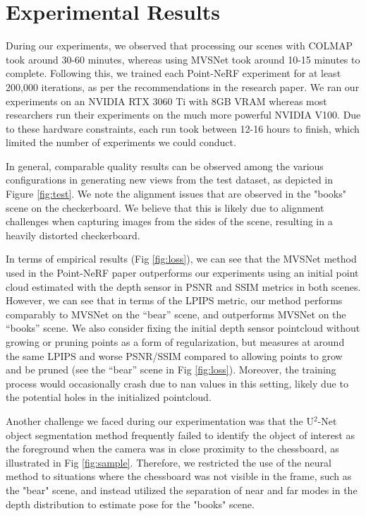 \documentclass[10pt,twocolumn,letterpaper]{article}
\begin{document}
\section{Experimental Results}
During our experiments, we observed that processing our scenes with COLMAP took around 30-60 minutes, whereas using MVSNet took around 10-15 minutes to complete. Following this, we trained each Point-NeRF experiment for at least 200,000 iterations, as per the recommendations in the research paper. We ran our experiments on an NVIDIA RTX 3060 Ti with 8GB VRAM whereas most researchers run their experiments on the much more powerful NVIDIA V100. Due to these hardware constraints, each run took between 12-16 hours to finish, which limited the number of experiments we could conduct. 

In general, comparable quality results can be observed among the various configurations in generating new views from the test dataset, as depicted in Figure \ref{fig:test}. We note the alignment issues that are observed in the "books" scene on the checkerboard. We believe that this is likely due to alignment challenges when capturing images from the sides of the scene, resulting in a heavily distorted checkerboard.

In terms of empirical results (Fig \ref{fig:loss}), we can see that the MVSNet method used in the Point-NeRF paper outperforms our experiments using an initial point cloud estimated with the depth sensor in PSNR and SSIM metrics in both scenes. However, we can see that in terms of the LPIPS metric, our method performs comparably to MVSNet on the “bear” scene, and outperforms MVSNet on the “books” scene. 
We also consider fixing the initial depth sensor pointcloud without growing or pruning points as a form of regularization, but measures at around the same LPIPS and worse PSNR/SSIM compared to allowing points to grow and be pruned (see the “bear” scene in Fig \ref{fig:loss}). Moreover, the training process would occasionally crash due to nan values in this setting, likely due to the potential holes in the initialized pointcloud. 

Another challenge we faced during our experimentation was that the U$^2$-Net object segmentation method \cite{U2Net} frequently failed to identify the object of interest as the foreground when the camera was in close proximity to the chessboard, as illustrated in Fig \ref{fig:sample}. Therefore, we restricted the use of the neural method to situations where the chessboard was not visible in the frame, such as the "bear" scene, and instead utilized the separation of near and far modes in the depth distribution to estimate pose for the "books" scene. 
\end{document}
